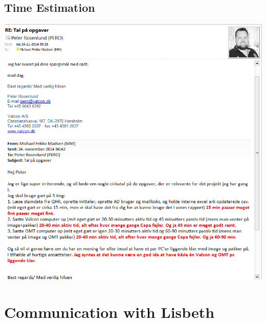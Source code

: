 \begin{linenumbers*}
\subsection{Time Estimation}
\label{app:peter_time_estimation}
\includegraphics[width=1.36\textwidth]{appendix/peter_communication_1}

\section{Communication with Lisbeth}


\end{linenumbers*}
